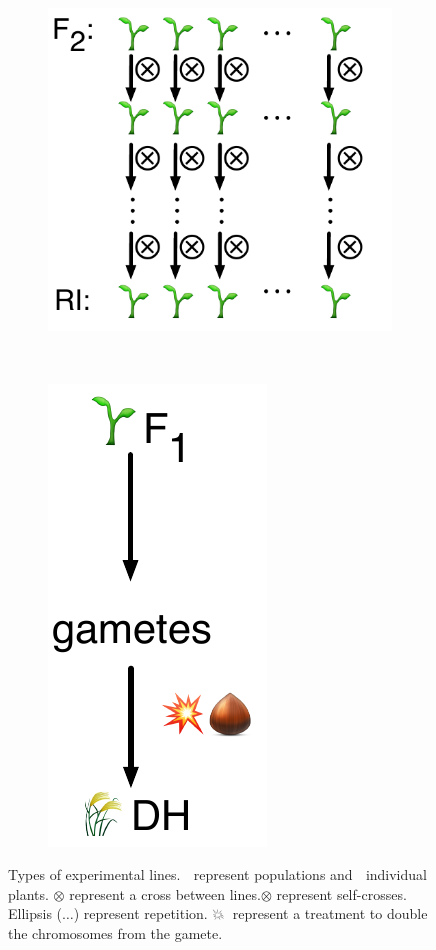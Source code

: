 \begin{figure}
\begin{subfigure}{0.45\textwidth}
\centering
\caption{}
\label{fig:lit:ri}
\includegraphics[height=0.20\textheight]{LitReview/Figures/crosses/RI.pdf}
\end{subfigure}
~
\begin{subfigure}{0.45\textwidth}
\centering
\caption{}
\label{fig:lit:dh}
\includegraphics[height=0.20\textheight]{LitReview/Figures/crosses/DH.pdf}
\end{subfigure}

\caption[Types of experimental lines]{Types of experimental lines. 🌾 represent populations and 🌱 individual plants. $\otimes$ represent a cross between lines.$\otimes$ represent self-crosses. Ellipsis ($\ldots$) represent repetition. 💥🌰 represent a treatment to double the chromosomes from the gamete.}
\end{figure}

